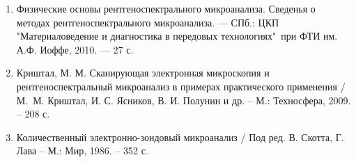 \documentclass[14pt]{extarticle}
\begin{document}
\begin{enumerate}
	\item Физические основы рентгеноспектрального микроанализа. Сведенья о методах рентгеноспектрального микроанализа. — СПб.: ЦКП "Материаловедение и диагностика в передовых технологиях"\ при ФТИ им. А.Ф. Иоффе, 2010. — 27 с.
	\item Криштал, М. М. Сканирующая электронная микроскопия и рентгеноспектральный микроанализ в примерах практического применения / М. М. Криштал, И. С. Ясников, В. И. Полунин и др. – М.: Техносфера, 2009. – 208 с.
	\item Количественный электронно-зондовый микроанализ / Под ред. В. Скотта, Г. Лава -- М.: Мир, 1986. -- 352 с.
\end{enumerate}
\end{document}
